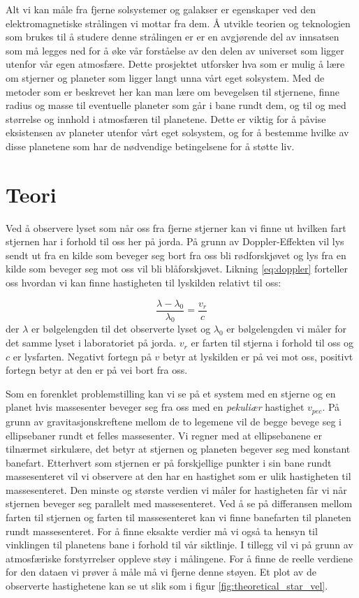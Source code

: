 \documentclass[english,notitlepage]{revtex4-1}  %
\begin{document}
Alt vi kan måle fra fjerne solsystemer og galakser er egenskaper ved den
 elektromagnetiske strålingen vi mottar fra dem. Å utvikle teorien og teknologien som brukes til å studere denne strålingen er er en avgjørende del av innsatsen som må legges ned for å øke vår forståelse av den delen av universet som ligger utenfor vår egen atmosfære. Dette prosjektet utforsker hva som er mulig å lære om stjerner og planeter som ligger langt unna vårt eget solsystem. Med de metoder som er beskrevet her kan man lære om bevegelsen til stjernene, finne radius og masse til eventuelle planeter som går i bane rundt dem, og til og med størrelse og innhold i atmosfæren til planetene. Dette er viktig for å påvise eksistensen av planeter utenfor vårt eget solsystem, og for å bestemme hvilke av disse planetene som har de nødvendige betingelsene for å støtte liv.


\section{Teori}

Ved å observere lyset som når oss fra fjerne stjerner kan vi finne ut hvilken fart
 stjernen har i forhold til oss her på jorda. På grunn av Doppler-Effekten vil lys sendt ut fra en kilde som beveger seg bort fra oss bli rødforskjøvet og lys fra en kilde som beveger seg mot oss vil bli blåforskjøvet. Likning \ref{eq:doppler} forteller oss hvordan vi kan finne hastigheten til lyskilden relativt til oss:

\begin{equation}
  \label{eq:doppler}
  \frac{\lambda - \lambda_0}{\lambda_0} = \frac{v_r}{c}
\end{equation}
der $\lambda$ er bølgelengden til det observerte lyset og $\lambda_0$ er bølgelengden vi
 måler for det samme lyset i laboratoriet på jorda. $v_r$ er farten til stjerna i forhold til oss og $c$ er lysfarten. Negativt fortegn på $v$ betyr at lyskilden er på vei mot oss, positivt fortegn betyr at den er på vei bort fra oss.

Som en forenklet problemstilling kan vi se på et system med en stjerne og en planet hvis
 massesenter beveger seg fra oss med en \textit{pekuliær} hastighet $v_{pec}$. På grunn av gravitasjonskreftene mellom de to legemene vil de begge bevege seg i ellipsebaner rundt et felles massesenter. Vi regner med at ellipsebanene er tilnærmet sirkulære, det betyr at stjernen og planeten begever seg med konstant banefart. Etterhvert som stjernen er på forskjellige punkter i sin bane rundt massesenteret vil vi observere at den har en hastighet som er ulik hastigheten til massesenteret. Den minste og største verdien vi måler for hastigheten får vi når stjernen beveger seg parallelt med massesenteret. Ved å se på differansen mellom farten til stjernen og farten til massesenteret kan vi finne banefarten til planeten rundt massesenteret. For å finne eksakte verdier må vi også ta hensyn til vinklingen til planetens bane i forhold til vår siktlinje. I tillegg vil vi på grunn av atmosfæriske forstyrrelser oppleve støy i målingene. For å finne de reelle verdiene for den dataen vi prøver å måle må vi fjerne denne støyen. Et plot av de observerte hastighetene kan se ut slik som i figur \ref{fig:theoretical_star_vel}.
\end{document}
